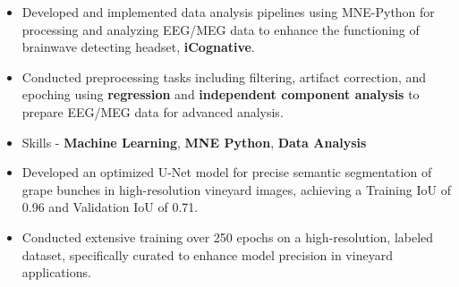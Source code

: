 \documentclass[10pt,a4paper,ragged2e]{altacv}
\begin{document}
\begin{fullwidth}
\begin{itemize}
\item Developed and implemented data analysis pipelines using MNE-Python for processing and analyzing EEG/MEG data to enhance the functioning of brainwave detecting headset, {\bf iCognative}.
\item Conducted preprocessing tasks including filtering, artifact correction, and epoching using {\bf regression} and {\bf independent component analysis} to prepare EEG/MEG data for advanced analysis.
\item Skills - {\bf Machine Learning}, {\bf MNE Python}, {\bf Data Analysis}
\end{itemize}

\begin{itemize}
 \item Developed an optimized U-Net model for precise semantic segmentation of grape bunches in high-resolution vineyard images, achieving a Training IoU of 0.96 and Validation IoU of 0.71.
 \item Conducted extensive training over 250 epochs on a high-resolution, labeled dataset, specifically curated to enhance model precision in vineyard applications.
\end{itemize}
\smallskip
\smallskip




\end{fullwidth}
\end{document}
